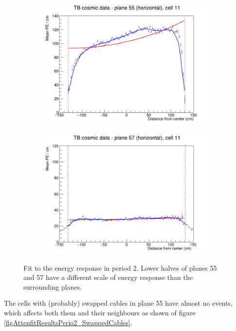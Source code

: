 \documentclass[12pt,a4paper]{article}
\begin{document}
\begin{figure}[h]
  \begin{subfigure}{0.5\textwidth}
    \includegraphics[width=\linewidth]{RelativeCalibrationResults/p2_055_011_extendedRange.png}
  \end{subfigure}
  \begin{subfigure}{0.5\textwidth}
    \includegraphics[width=\linewidth]{RelativeCalibrationResults/p2_057_011.png}
  \end{subfigure}
  \caption{Fit to the energy response in period 2. Lower halves of planes 55 and 57 have a different scale of energy response than the surrounding planes.}
  \label{figAttenfitResultsPerio2_FaultyFEB}
\end{figure}

The cells with (probably) swapped cables in plane 55 have almost no events, which affects both them and their neighbours as shown of figure \ref{figAttenfitResultsPerio2_SwappedCables}.
\end{document}
